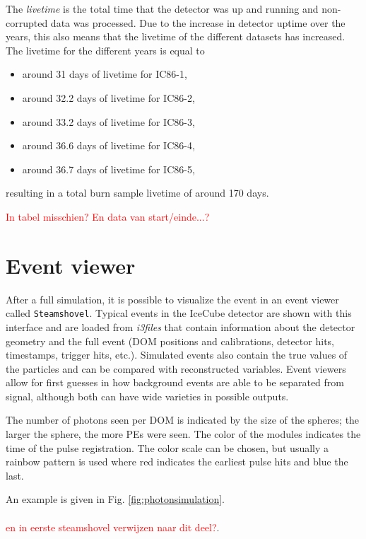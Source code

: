 \noindent The \textit{livetime} is the total time that the detector was up and running and non-corrupted data was processed. Due to the increase in detector uptime over the years, this also means that the livetime of the different datasets has increased. The livetime for the different years is equal to
\vspace{2mm}
\begin{itemize}
\item around 31 days of livetime for IC86-1,
\item around 32.2 days of livetime for IC86-2,
\item around 33.2 days of livetime for IC86-3,
\item around 36.6 days of livetime for IC86-4,
\item around 36.7 days of livetime for IC86-5,
\end{itemize}

\noindent resulting in a total burn sample livetime of around 170 days.

\textcolor{red}{In tabel misschien? En data van start/einde...?}

\section{Event viewer}
After a full simulation, it is possible to visualize the event in an event viewer called \texttt{Steamshovel}. Typical events in the IceCube detector are shown with this interface and are loaded from \textit{i3files} that contain information about the detector geometry and the full event (DOM positions and calibrations, detector hits, timestamps, trigger hits, etc.). Simulated events also contain the true values of the particles and can be compared with reconstructed variables. Event viewers allow for first guesses in how background events are able to be separated from signal, although both can have wide varieties in possible outputs.

The number of photons seen per DOM is indicated by the size of the spheres; the larger the sphere, the more PEs were seen. The color of the modules indicates the time of the pulse registration. The color scale can be chosen, but usually a rainbow pattern is used where red indicates the earliest pulse hits and blue the last. 

An example is given in Fig. \ref{fig:photonsimulation}. \textcolor{red}{\\ \\ en in eerste steamshovel verwijzen naar dit deel?}.